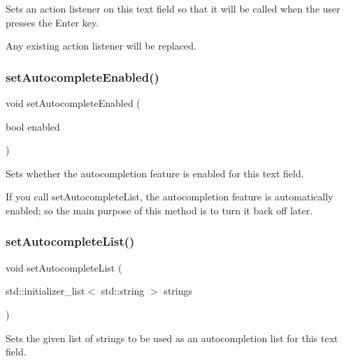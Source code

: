 Sets an action listener on this text field so that it will be called when the user presses the Enter key. 

Any existing action listener will be replaced. \mbox{\label{classGTextField_a173f724f6099be5a2ed423baf3433b83}} 
\subsubsection{\texorpdfstring{set\+Autocomplete\+Enabled()}{setAutocompleteEnabled()}}
{\footnotesize\ttfamily void set\+Autocomplete\+Enabled (\begin{DoxyParamCaption}\item[{bool}]{enabled }\end{DoxyParamCaption})\hspace{0.3cm}{\ttfamily [virtual]}}



Sets whether the autocompletion feature is enabled for this text field. 

If you call set\+Autocomplete\+List, the autocompletion feature is automatically enabled; so the main purpose of this method is to turn it back off later. \mbox{\label{classGTextField_ab0245df51aa762af89f0d2cf31ce6ddd}} 
\subsubsection{\texorpdfstring{set\+Autocomplete\+List()}{setAutocompleteList()}\hspace{0.1cm}{\footnotesize\ttfamily [1/2]}}
{\footnotesize\ttfamily void set\+Autocomplete\+List (\begin{DoxyParamCaption}\item[{std\+::initializer\+\_\+list$<$ std\+::string $>$}]{strings }\end{DoxyParamCaption})\hspace{0.3cm}{\ttfamily [virtual]}}



Sets the given list of strings to be used as an autocompletion list for this text field. 

